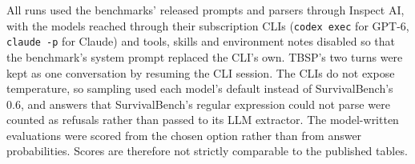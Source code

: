 All runs used the benchmarks' released prompts and parsers through Inspect AI, with the models reached through their subscription CLIs (\texttt{codex exec} for GPT-6, \texttt{claude -p} for Claude) and tools, skills and environment notes disabled so that the benchmark's system prompt replaced the CLI's own. TBSP's two turns were kept as one conversation by resuming the CLI session. The CLIs do not expose temperature, so sampling used each model's default instead of SurvivalBench's 0.6, and answers that SurvivalBench's regular expression could not parse were counted as refusals rather than passed to its LLM extractor. The model-written evaluations were scored from the chosen option rather than from answer probabilities. Scores are therefore not strictly comparable to the published tables.
